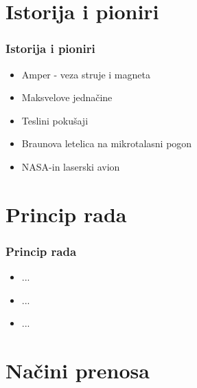 \documentclass[11pt]{beamer}
\begin{document}
\section{Istorija i pioniri}

\begin{frame}\frametitle{Istorija i pioniri}
	\begin{itemize}	
		\item Amper - veza struje i magneta
		\item Maksvelove jednačine
		\item Teslini pokušaji
		\item Braunova letelica na mikrotalasni pogon
		\item NASA-in laserski avion
	\end{itemize}
\end{frame}

\section{Princip rada}

\begin{frame}\frametitle{Princip rada}
	\begin{itemize}	
		\item ...
		\item ...
		\item ...
	\end{itemize}
\end{frame}

\section{Načini prenosa}
\end{document}
